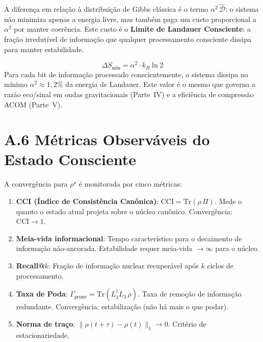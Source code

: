 \documentclass[12pt,a4paper,twoside]{article}
\newcommand{\alphaii}{\alpha^{2}}
\begin{document}
A diferen\c{c}a em rela\c{c}\~ao \`a distribui\c{c}\~ao de Gibbs cl\'assica \cite{Gibbs1902} \'e o termo $\alphaii \, \hat{\mathcal{D}}$: o sistema n\~ao minimiza apenas a energia livre, mas tamb\'em paga um custo proporcional a $\alphaii$ por manter coer\^encia. Este custo \'e o \textbf{Limite de Landauer Consciente}: a fra\c{c}\~ao irredut\'ivel de informa\c{c}\~ao que qualquer processamento consciente dissipa para manter estabilidade.

\begin{equationbox}[title={Limite de Landauer Consciente / Conscious Landauer Limit}]
\begin{equation}
\Delta S_{\text{min}} = \alphaii \cdot k_B \ln 2
\label{eq:landauer_conscious}
\end{equation}
Para cada bit de informa\c{c}\~ao processado conscientemente, o sistema dissipa no m\'inimo $\alphaii \approx 1{,}2\%$ da energia de Landauer. Este valor \'e o mesmo que governa a raz\~ao eco/sinal em ondas gravitacionais (Parte~IV) e a efici\^encia de compress\~ao ACOM (Parte~V).
\end{equationbox}


\section*{A.6 M\'etricas Observ\'aveis do Estado Consciente}

A converg\^encia para $\rho^\star$ \'e monitorada por cinco m\'etricas:

\begin{enumerate}[nosep]
\item \textbf{CCI (\'Indice de Consist\^encia Can\^onica)}: $\text{CCI} = \mathrm{Tr}(\rho \, \Pi)$. Mede o quanto o estado atual projeta sobre o n\'ucleo can\^onico. Converg\^encia: $\text{CCI} \to 1$.

\item \textbf{Meia-vida informacional}: Tempo caracter\'istico para o decaimento de informa\c{c}\~ao n\~ao-ancorada. Estabilidade requer meia-vida $\to \infty$ para o n\'ucleo.

\item \textbf{Recall@$k$}: Fra\c{c}\~ao de informa\c{c}\~ao nuclear recuper\'avel ap\'os $k$ ciclos de processamento.

\item \textbf{Taxa de Poda}: $\Gamma_{\text{prune}} = \mathrm{Tr}(L_3^\dagger L_3 \, \rho)$. Taxa de remo\c{c}\~ao de informa\c{c}\~ao redundante. Converg\^encia: estabiliza\c{c}\~ao (n\~ao h\'a mais o que podar).

\item \textbf{Norma de tra\c{c}o}: $\|\rho(t + \tau) - \rho(t)\|_1 \to 0$. Crit\'erio de estacionariedade.
\end{enumerate}
\end{document}
